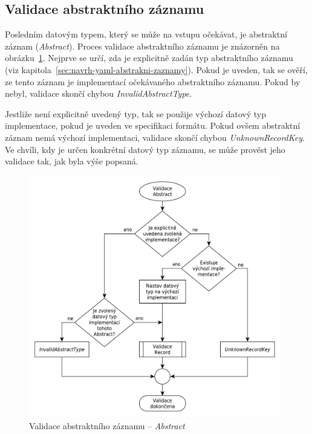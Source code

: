 \documentclass[FM,bw,DP]{tulthesis}
\begin{document}
\subsection{Validace abstraktního záznamu}

Posledním datovým typem, který se může na vstupu očekávat, je abstraktní záznam (\textit{Abstract}). Proces validace abstraktního záznamu je znázorněn na obrázku~\ref{img:validation_abstract}. Nejprve se určí, zda je explicitně zadán typ abstraktního záznamu (viz kapitola~\ref{sec:navrh-yaml-abstrakni-zaznamy}). Pokud je uveden, tak se ověří, ze tento záznam je implementací očekávaného abstraktního záznamu. Pokud by nebyl, validace skončí chybou \textit{InvalidAbstractType}.

Jestliže není explicitně uvedený typ, tak se použije výchozí datový typ implementace, pokud je uveden ve specifikaci formátu. Pokud ovšem abstraktní záznam nemá výchozí implementaci, validace skončí chybou \textit{UnknownRecordKey}. Ve chvíli, kdy je určen konkrétní datový typ záznamu, se může provést jeho validace tak, jak byla výše popsaná.

\begin{figure}[H]
	\centering
    \includegraphics[width=0.98\textwidth]{../img/validation_abstract.pdf}
    \caption{Validace abstraktního záznamu -- \textit{Abstract}}
	\label{img:validation_abstract}
\end{figure}
\end{document}
